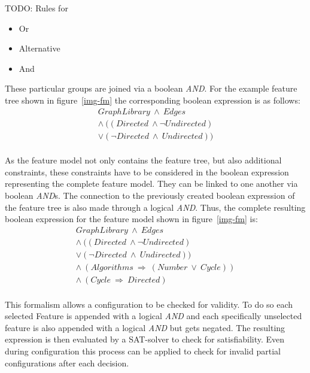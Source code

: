 {\color{red}TODO: Rules for
\begin{itemize}
	\item Or
	\item Alternative
	\item And
\end{itemize}
}
These particular groups are joined via a boolean \textit{AND}. For the example feature tree shown in figure~\ref{img-fm} the corresponding boolean expression is as follows:
\begin{equation}
\begin{split}
	GraphLibrary\ \wedge\ Edges\\
	\wedge\ ((Directed\ \wedge \neg Undirected)\\
	\vee (\neg Directed\ \wedge\ Undirected))
\end{split}
\end{equation}\\

As the feature model not only contains the feature tree, but also additional constraints, these constraints have to be considered in the boolean expression representing the complete feature model. They can be linked to one another via boolean \textit{AND}s. The connection to the previously created boolean expression of the feature tree is also made through a logical \textit{AND}. Thus, the complete resulting boolean expression for the feature model shown in figure~\ref{img-fm} is:
\begin{equation}
\begin{split}
	GraphLibrary\ \wedge\ Edges\\
	\wedge\ ((Directed\ \wedge \neg Undirected)\\
	\vee (\neg Directed\ \wedge\ Undirected))\\
	\wedge\ (Algorithms\ \Rightarrow\ (Number\ \vee\ Cycle))\\
	\wedge\ (Cycle\ \Rightarrow\ Directed)
\end{split}
\end{equation}\\
This formalism allows a configuration to be checked for validity. To do so each selected Feature is appended with a logical \textit{AND} and each specifically unselected feature is also appended with a logical \textit{AND} but gets negated. The resulting expression is then evaluated by a SAT-solver to check for satisfiability. Even during configuration this process can be applied to check for invalid partial configurations after each decision.
